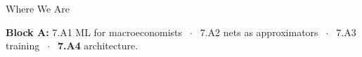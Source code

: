 

\graphicspath{{./figures/}}

\newcommand{\repo}[2]{\href{https://github.com/vonzhg/Macro-2026Fall/blob/main/#1}{\texttt{#2}}}




\makedecktitle

\begin{frame}{Where We Are}
\vspace{-1mm}
\begin{center}
\small \textbf{Block A:} 7.A1 ML for macroeconomists $\;\cdot\;$ 7.A2 nets as approximators $\;\cdot\;$ 7.A3 training $\;\cdot\;$ \textbf{7.A4} architecture.
\end{center}
\end{frame}

